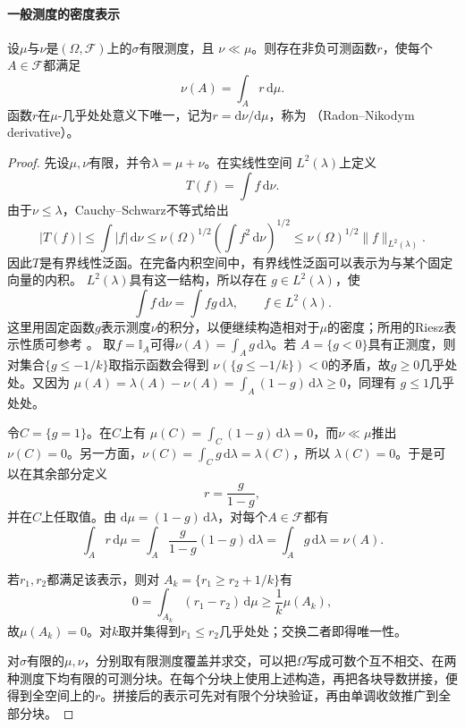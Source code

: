 \paragraph{一般测度的密度表示}
\begin{theorem}
\label{thm:probability-radon-nikodym}
设\(\mu\)与\(\nu\)是\((\Omega,\mathcal{F})\)上的\(\sigma\)有限测度，且
\(\nu\ll\mu\)。则存在非负可测函数\(r\)，使每个\(A\in\mathcal{F}\)都满足
\begin{equation}
  \nu(A)=\int_A r\,\mathrm{d}\mu.
  \label{eq:probability-rn-representation}
\end{equation}
函数\(r\)在\(\mu\)-几乎处处意义下唯一，记为\(r=\mathrm{d}\nu/\mathrm{d}\mu\)，称为
（Radon--Nikodym derivative）。
\end{theorem}

\begin{proof}
先设\(\mu,\nu\)有限，并令\(\lambda=\mu+\nu\)。在实线性空间
\(L^2(\lambda)\)上定义
\[
  T(f)=\int f\,\mathrm{d}\nu.
\]
由于\(\nu\leq\lambda\)，Cauchy--Schwarz不等式给出
\[
  |T(f)|
  \leq\int|f|\,\mathrm{d}\nu
  \leq\nu(\Omega)^{1/2}
       \left(\int f^2\,\mathrm{d}\nu\right)^{1/2}
  \leq\nu(\Omega)^{1/2}\lVert f\rVert_{L^2(\lambda)}.
\]
因此\(T\)是有界线性泛函。在完备内积空间中，有界线性泛函可以表示为与某个固定向量的内积。
\(L^2(\lambda)\)具有这一结构，所以存在
\(g\in L^2(\lambda)\)，使
\[
  \int f\,\mathrm{d}\nu=\int fg\,\mathrm{d}\lambda,
  \qquad f\in L^2(\lambda).
\]
这里用固定函数\(g\)表示测度\(\nu\)的积分，以便继续构造相对于\(\mu\)的密度；所用的Riesz表示性质可参考
。
取\(f=\mathbb{I}_A\)可得\(\nu(A)=\int_Ag\,\mathrm{d}\lambda\)。若
\(A=\{g<0\}\)具有正测度，则对集合\(\{g\leq-1/k\}\)取指示函数会得到
\(\nu(\{g\leq-1/k\})<0\)的矛盾，故\(g\geq0\)几乎处处。又因为
\(\mu(A)=\lambda(A)-\nu(A)=\int_A(1-g)\,\mathrm{d}\lambda\geq0\)，同理有
\(g\leq1\)几乎处处。

令\(C=\{g=1\}\)。在\(C\)上有
\(\mu(C)=\int_C(1-g)\,\mathrm{d}\lambda=0\)，而\(\nu\ll\mu\)推出
\(\nu(C)=0\)。另一方面，\(\nu(C)=\int_Cg\,\mathrm{d}\lambda=\lambda(C)\)，所以
\(\lambda(C)=0\)。于是可以在其余部分定义
\[
  r=\frac{g}{1-g},
\]
并在\(C\)上任取值。由
\(\mathrm{d}\mu=(1-g)\,\mathrm{d}\lambda\)，对每个\(A\in\mathcal{F}\)都有
\[
  \int_A r\,\mathrm{d}\mu
  =\int_A\frac{g}{1-g}(1-g)\,\mathrm{d}\lambda
  =\int_Ag\,\mathrm{d}\lambda
  =\nu(A).
\]

若\(r_1,r_2\)都满足该表示，则对
\(A_k=\{r_1\geq r_2+1/k\}\)有
\[
  0=\int_{A_k}(r_1-r_2)\,\mathrm{d}\mu
  \geq\frac{1}{k}\mu(A_k),
\]
故\(\mu(A_k)=0\)。对\(k\)取并集得到\(r_1\leq r_2\)几乎处处；交换二者即得唯一性。

对\(\sigma\)有限的\(\mu,\nu\)，分别取有限测度覆盖并求交，可以把\(\Omega\)写成可数个互不相交、在两种测度下均有限的可测分块。在每个分块上使用上述构造，再把各块导数拼接，便得到全空间上的\(r\)。拼接后的表示可先对有限个分块验证，再由单调收敛推广到全部分块。
\end{proof}

